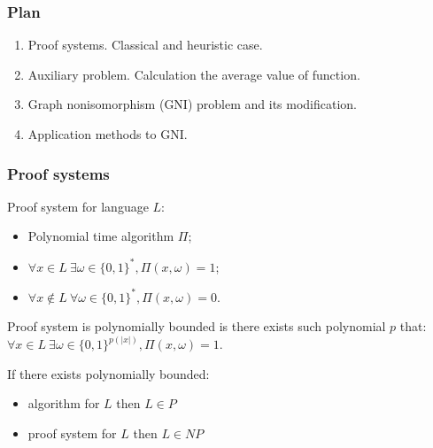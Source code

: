 \begin{frame}
    \frametitle{Plan}

    \begin{enumerate}
	    \item Proof systems. Classical and heuristic case.
    	\item Auxiliary problem. Calculation the average value of function.
    	\item Graph nonisomorphism (GNI) problem and its modification.
    	\item Application methods to GNI.
    \end{enumerate}
\end{frame}

\begin{frame}
	\frametitle{Proof systems}

    \begin{definition}
        Proof system for language $L$:
        \begin{itemize}
            \item Polynomial time algorithm $\Pi$;
            \item $\forall x \in L~ \exists \omega \in \{0, 1\}^{*}, \Pi(x, \omega) = 1$;
        	\item $\forall x \notin L~ \forall \omega \in \{0, 1\}^{*}, 
        		\Pi(x, \omega) = 0$.
        \end{itemize}
    \end{definition}

    Proof system is polynomially bounded is there exists such polynomial $p$ that:
    $\forall x \in L~ \exists \omega \in \{0, 1\}^{p(|x|)}, \Pi(x, \omega) = 1$.


    If there exists polynomially bounded:
    \begin{itemize}
        \item algorithm for $L$ then $L \in P$
	    \item proof system for $L$ then $L \in NP$
    \end{itemize}

\end{frame}

